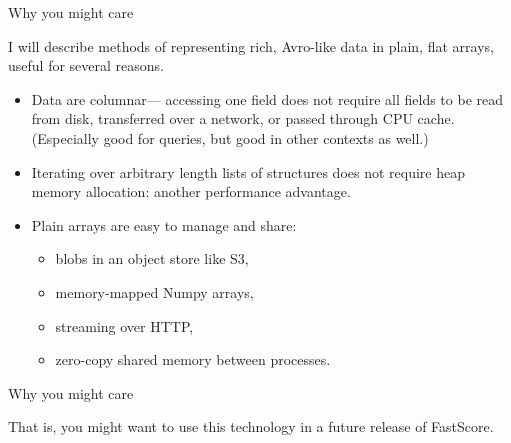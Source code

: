 \documentclass{beamer}
\begin{document}
\begin{frame}{Why you might care}
\vspace{0.5 cm}

\large
I will describe methods of representing rich, Avro-like data in plain, flat arrays, useful for several reasons.

\vspace{0.1 cm}
\begin{itemize}\setlength{\itemsep}{0.2 cm}
\item<2-> Data are columnar--- accessing one field does not require all fields to be read from disk, transferred over a network, or passed through CPU cache. (Especially good for queries, but good in other contexts as well.)
\item<3-> Iterating over arbitrary length lists of structures does not require heap memory allocation: another performance advantage.
\item<4-> Plain arrays are easy to manage and share:
\begin{itemize}
\item blobs in an object store like S3,
\item memory-mapped Numpy arrays,
\item streaming over HTTP,
\item zero-copy shared memory between processes.
\end{itemize}
\end{itemize}
\end{frame}

\begin{frame}{Why you might care}
\Large
\begin{center}
That is, you might want to use this technology in a future release of FastScore.
\end{center}
\end{frame}
\end{document}
